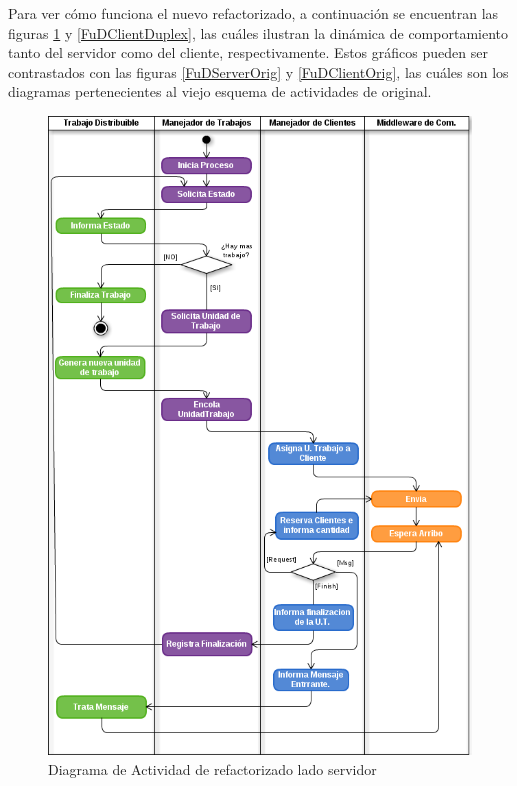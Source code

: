 Para ver cómo funciona el nuevo \fud{} refactorizado, a continuación se encuentran las figuras \ref{FuDServerDuplex} y
\ref{FuDClientDuplex}, las cuáles ilustran la dinámica de comportamiento tanto del servidor como del cliente, respectivamente. Estos
gráficos pueden ser contrastados con las figuras \ref{FuDServerOrig} y \ref{FuDClientOrig}, las cuáles son los diagramas pertenecientes al
viejo esquema de actividades de \fud{} original.

\begin{figure}[ht]
    \includegraphics[scale=0.65]{images/ActivityFuDServer-Duplex.png}
    \caption{Diagrama de Actividad de \fud{} refactorizado lado servidor}
    \label{FuDServerDuplex}
\end{figure}

